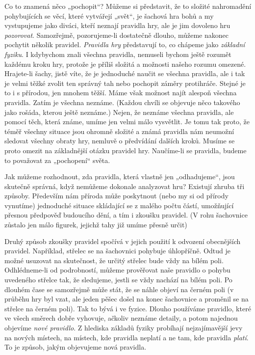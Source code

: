     Co to znamená něco „pochopit“? Můžeme si představit, že to složité nahromadění pohybujících se 
    věcí, které vytvářejí „svět“, je šachová hra bohů a my vystupujeme jako diváci, kteří neznají 
    pravidla hry, ale je jim dovoleno hru \emph{pozorovat}. Samozřejmě, pozorujeme-li dostatečně 
    dlouho, můžeme nakonec pochytit několik pravidel. \emph{Pravidla hry} představují to, co 
    chápeme jako \emph{základní fyziku}. I  kdybychom znali všechna pravidla, nemuseli bychom ještě 
    rozumět každému kroku hry, protože je příliš složitá a možnosti našeho rozumu omezené. 
    Hrajete-li šachy, jistě víte, že je jednoduché naučit se všechna pravidla, ale i tak je velmi 
    těžké zvolit ten správný tah nebo pochopit záměry protihráče. Stejné je to i s přírodou, jen 
    mnohem těžší. Máme však možnost najít alespoň všechna pravidla. Zatím je všechna neznáme. 
    (Každou chvíli se objevuje něco takového jako rošáda, kterou ještě neznáme.) Nejen, že neznáme 
    všechna pravidla, ale pomocí těch, která známe, umíme jen velmi málo vysvětlit. Je tomu tak 
    proto, že téměř všechny situace jsou ohromně složité a známá pravidla nám neumožní sledovat 
    všechny obraty hry, nemluvě o předvídání dalších kroků. Musíme se proto omezit na základnější 
    otázku pravidel hry. Naučíme-li se pravidla, budeme to považovat za „pochopení“ světa.
    
    Jak můžeme rozhodnout, zda pravidla, která vlastně jen „odhadujeme“, jsou skutečně správná, 
    když nemůžeme dokonale analyzovat hru? Existují zhruba tři způsoby. Především nám příroda může 
    poskytnout (nebo my si od přírody vynutíme) jednoduché situace skládající se z malého počtu 
    částí, umožňující přesnou předpověď budoucího dění, a tím i zkoušku pravidel. (V rohu 
    šachovnice zůstalo jen málo figurek, jejichž tahy již umíme přesně určit)
    
    Druhý způsob zkoušky pravidel spočívá v jejich použití k odvození obecnějších pravidel. 
    Například, střelec se na šachovnici pohybuje úhlopříčně. Odtud je možné usuzovat na skutečnost, 
    že určitý střelec bude vždy na bílém poli. Odhlédneme-li od podrobností, můžeme prověřovat naše 
    pravidlo o pohybu uvedeného střelce tak, že sledujeme, jestli se vždy nachází na bílém poli. Po 
    dlouhém čase se samozřejmě může stát, že se náhle objeví na černém poli (v průběhu hry byl 
    vzat, ale jeden pěšec došel na konec šachovnice a proměnil se na střelce na černém poli). Tak 
    to bývá i ve fyzice. Dlouho používáme pravidlo, které ve všech směrech dobře vyhovuje, ačkoliv 
    neznáme detaily, a potom najednou objevíme \emph{nové pravidlo}. Z hlediska základů fyziky 
    probíhají nejzajímavější jevy na nových místech, na místech, kde pravidla neplatí a ne tam, kde 
    pravidla \emph{platí}. To je způsob, jakým objevujeme nová pravidla.
    
